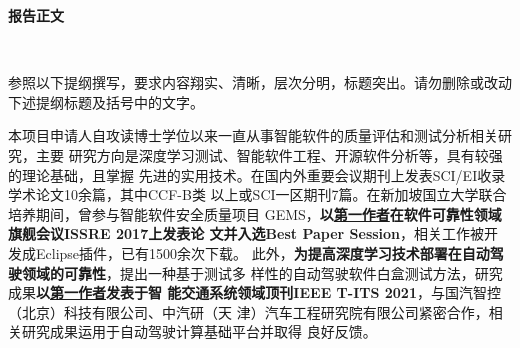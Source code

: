 \documentclass[a4paper,zihao=-4]{article}
\begin{document}

\setlength{\abovedisplayskip}{0pt}
\setlength{\belowdisplayskip}{0pt}

\begin{center}
	{\kaishu {} \textbf{报告正文} \vspace{-3ex}}
\end{center}

\thispagestyle{empty} 　　　%

{\kaishu {}参照以下提纲撰写，要求内容翔实、清晰，层次分明，标题突出。}\alert{请勿删除或改动下述提纲标题及括号中的文字。\vspace{9bp}}





















本项目申请人自攻读博士学位以来一直从事智能软件的质量评估和测试分析相关研究，主要
研究方向是深度学习测试、智能软件工程、开源软件分析等，具有较强的理论基础，且掌握
先进的实用技术。{在国内外重要会议期刊上发表SCI/EI收录学术论文10余篇，其中CCF-B类
以上或SCI一区期刊7篇}。在新加坡国立大学联合培养期间，曾参与智能软件安全质量项目
GEMS，\textbf{以{\underline{第一作者}在软件可靠性领域旗舰会议ISSRE 2017上发表论
文并入选{Best Paper Session}}}，相关工作被开发成Eclipse插件，已有1500余次下载。
此外，\textbf{为提高深度学习技术部署在自动驾驶领域的可靠性}，提出{一种基于测试多
样性的自动驾驶软件白盒测试方法}，研究成果\textbf{以\underline{第一作者}发表于智
能交通系统领域顶刊IEEE T-ITS 2021}，与国汽智控（北京）科技有限公司、中汽研（天
津）汽车工程研究院有限公司紧密合作，相关研究成果运用于自动驾驶计算基础平台并取得
良好反馈。
\end{document}
